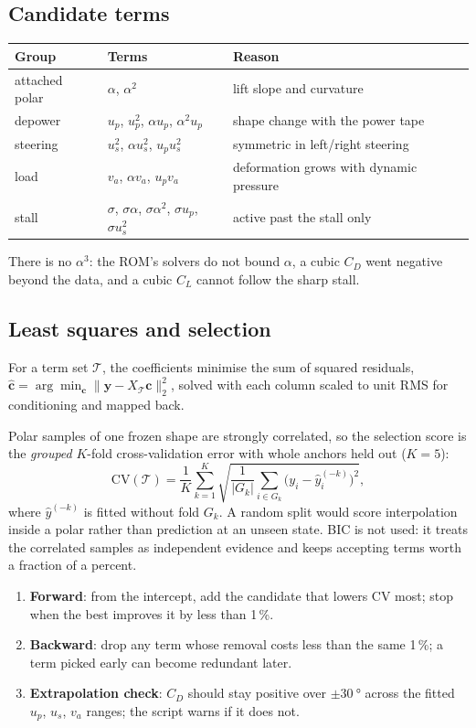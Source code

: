 \documentclass[11pt,a4paper]{article}
\begin{document}
\subsection{Candidate terms}
\begin{center}
\begin{tabular}{lll}
\toprule
Group & Terms & Reason \\
\midrule
attached polar & $\alpha$, $\alpha^2$ & lift slope and curvature \\
depower & $u_p$, $u_p^2$, $\alpha u_p$, $\alpha^2u_p$ & shape change with the power tape \\
steering & $u_s^2$, $\alpha u_s^2$, $u_pu_s^2$ & symmetric in left/right steering \\
load & $v_a$, $\alpha v_a$, $u_pv_a$ & deformation grows with dynamic pressure \\
stall & $\sigma$, $\sigma\alpha$, $\sigma\alpha^2$, $\sigma u_p$, $\sigma u_s^2$ & active past the stall only \\
\bottomrule
\end{tabular}
\end{center}
There is no $\alpha^3$: the ROM's solvers do not bound $\alpha$, a cubic $C_D$
went negative beyond the data, and a cubic $C_L$ cannot follow the sharp stall.

\subsection{Least squares and selection}
For a term set $\mathcal T$, the coefficients minimise the sum of squared
residuals, $\hat{\mathbf c}=\arg\min_{\mathbf c}\lVert\mathbf y-X_\mathcal T\mathbf c\rVert_2^2$,
solved with each column scaled to unit RMS for conditioning and mapped back.

Polar samples of one frozen shape are strongly correlated, so the selection
score is the \emph{grouped} $K$-fold cross-validation error with whole anchors
held out ($K=5$):
\begin{equation}
  \mathrm{CV}(\mathcal T)=\frac1K\sum_{k=1}^K
  \sqrt{\frac{1}{|G_k|}\sum_{i\in G_k}\bigl(y_i-\hat y_i^{(-k)}\bigr)^2},
\end{equation}
where $\hat y^{(-k)}$ is fitted without fold $G_k$. A random split would score
interpolation inside a polar rather than prediction at an unseen state. BIC
is not used: it treats the correlated samples as independent evidence and
keeps accepting terms worth a fraction of a percent.

\begin{enumerate}
  \item \textbf{Forward}: from the intercept, add the candidate that lowers
        $\mathrm{CV}$ most; stop when the best improves it by less than
        1\,\%.
  \item \textbf{Backward}: drop any term whose removal costs less than the same
        1\,\%; a term picked early can become redundant later.
  \item \textbf{Extrapolation check}: $C_D$ should stay positive over
        $\pm\SI{30}{\degree}$ across the fitted $u_p$, $u_s$, $v_a$ ranges; the
        script warns if it does not.
\end{enumerate}
\end{document}
